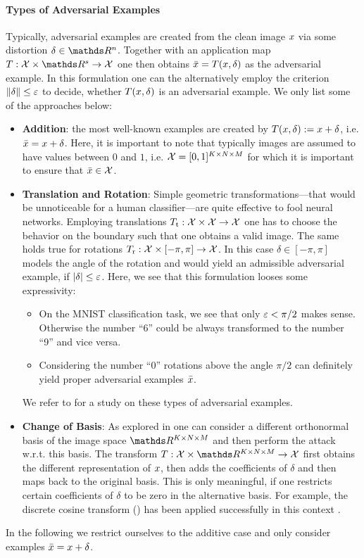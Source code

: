 \paragraph{Types of Adversarial Examples} Typically, adversarial examples are created from the clean image $x$ via some distortion $\delta\in\R^n$. Together with an application map $T:\Inp\times\R^s\to\Inp$ one then obtains $\bar{x}=T(x,\delta)$ as the adversarial example. In this formulation one can the alternatively employ the criterion $\|\delta\|\leq \varepsilon$ to decide, whether $T(x,\delta)$ is an adversarial example. We only list some of the approaches below:
%
\begin{itemize}
\item\textbf{Addition}: the most well-known examples are created by $T(x,\delta):=x+\delta$, i.e. $\bar{x} = x + \delta$. Here, it is important to note that typically images are assumed to have values between $0$ and $1$, i.e. $\mathcal{X}=[0,1]^{K\times N\times M}$ for which it is important to ensure that $\bar{x}\in\mathcal{X}$.
%
\item\textbf{Translation and Rotation}: Simple geometric transformations---that would be unnoticeable for a human classifier---are quite effective to fool neural networks. Employing translations $T_{\text{t}}:\mathcal{X}\times\mathcal{X}\to\mathcal{X}$ one has to choose the behavior on the boundary such that one obtains a valid image. The same holds true for rotations $T_{\text{r}}:\mathcal{X}\times [-\pi,\pi]\to\mathcal{X}$. In this case $\delta\in[-\pi,\pi]$ models the angle of the rotation and would yield an admissible adversarial example, if $\left|\delta\right|\leq \varepsilon$. Here, we see that this formulation looses some expressivity:
%
\begin{itemize}
\item On the MNIST classification task, we see that only $\varepsilon<\pi/2$ makes sense. Otherwise the number \enquote{6} could be always transformed to the number \enquote{9} and vice versa.
\item Considering the number \enquote{0} rotations above the angle $\pi/2$ can definitely yield proper adversarial examples $\bar{x}$.
\end{itemize}
%
We refer to \cite{engstrom2018rotation} for a study on these types of adversarial examples.
%
\item\textbf{Change of Basis}: As explored in \cite{guo2017countering} one can consider a different orthonormal basis of the image space $\R^{K\times N\times M}$ and then perform the attack w.r.t. this basis. 
The transform $T:\Inp\times\R^{K\times N\times M}\to\Inp$ first obtains the different representation of $x$, then adds the coefficients of $\delta$ and then maps back to the original basis. This is only meaningful, if one restricts certain coefficients of $\delta$ to be zero in the alternative basis. For example, the discrete cosine transform (\cite{ahmed1974discrete}) has been applied successfully in this context \cite{guo2017countering}.
\end{itemize}
%
%
In the following we restrict ourselves to the additive case and only consider examples $\bar{x} = x + \delta$.
%
%
